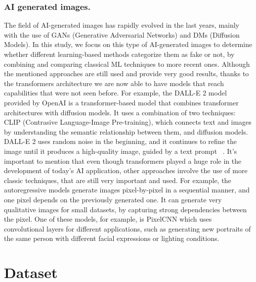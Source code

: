 \documentclass[runningheads]{llncs}
\begin{document}
\subsubsection{AI generated images.} The field of AI-generated images has rapidly evolved in the last years, mainly with the use of GANs (Generative Adversarial Networks) and DMs (Diffusion Models). In this study, we focus on this type of AI-generated images to determine whether different learning-based methods categorize them as fake or not, by combining and comparing classical ML techniques to more recent ones. Although the mentioned approaches are still used and provide very good results, thanks to the transformers architecture we are now able to have models that reach capabilities that were not seen before. For example, the DALL-E 2 model provided by OpenAI is a transformer-based model that combines transformer architectures with diffusion models. It uses a combination of two techniques: CLIP (Contrasive Language-Image Pre-training), which connects text and images by understanding the semantic relationship between them, and diffusion models. DALL-E 2 uses random noise in the beginning, and it continues to refine the image until it produces a high-quality image, guided by a text prompt ~\cite{ramesh2022clip}. It's important to mention that even though transformers played a huge role in the development of today's AI application, other approaches involve the use of more classic techniques, that are still very important and used. For example, the autoregressive models generate images pixel-by-pixel in a sequential manner, and one pixel depends on the previously generated one. It can generate very qualitative images for small datasets, by capturing strong dependencies between the pixel. One of these models, for example, is PixelCNN which uses convolutional layers for different applications, such as generating new portraits of the same person with different facial expressions or lighting conditions\cite{oord2016pixelcnn}.

%
%
\section{Dataset}
\end{document}

